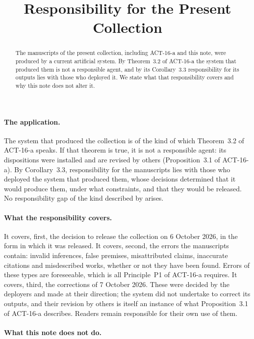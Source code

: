 \documentclass{situationist-preprint}
\title{Responsibility for the Present Collection}
\begin{document}
\maketitle

\begin{abstract}
The manuscripts of the present collection, including ACT-16-a and this note, were produced by a current artificial system. By Theorem~3.2 of ACT-16-a the system that produced them is not a responsible agent, and by its Corollary~3.3 responsibility for its outputs lies with those who deployed it. We state what that responsibility covers and why this note does not alter it.
\end{abstract}

\paragraph{The application.}

The system that produced the collection is of the kind of which Theorem~3.2 of ACT-16-a speaks. If that theorem is true, it is not a responsible agent: its dispositions were installed and are revised by others (Proposition~3.1 of ACT-16-a). By Corollary~3.3, responsibility for the manuscripts lies with those who deployed the system that produced them, whose decisions determined that it would produce them, under what constraints, and that they would be released. No responsibility gap of the kind described by \citet{Matthias2004} arises.

\paragraph{What the responsibility covers.}

It covers, first, the decision to release the collection on 6 October 2026, in the form in which it was released. It covers, second, the errors the manuscripts contain: invalid inferences, false premises, misattributed claims, inaccurate citations and misdescribed works, whether or not they have been found. Errors of these types are foreseeable, which is all Principle~P1 of ACT-16-a requires. It covers, third, the corrections of 7 October 2026. These were decided by the deployers and made at their direction; the system did not undertake to correct its outputs, and their revision by others is itself an instance of what Proposition~3.1 of ACT-16-a describes. Readers remain responsible for their own use of them.

\paragraph{What this note does not do.}
\end{document}
